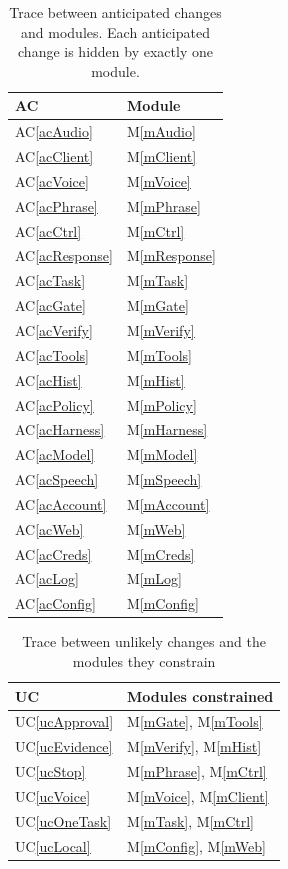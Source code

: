 \documentclass[12pt, titlepage]{article}
\newcommand{\acref}[1]{AC\ref{#1}}
\newcommand{\ucref}[1]{UC\ref{#1}}
\newcommand{\mref}[1]{M\ref{#1}}
\begin{document}
\begin{table}[H]
\centering
\begin{tabular}{|l|l|}
\hline
\textbf{AC} & \textbf{Module}\\
\hline
\acref{acAudio} & \mref{mAudio}\\
\hline
\acref{acClient} & \mref{mClient}\\
\hline
\acref{acVoice} & \mref{mVoice}\\
\hline
\acref{acPhrase} & \mref{mPhrase}\\
\hline
\acref{acCtrl} & \mref{mCtrl}\\
\hline
\acref{acResponse} & \mref{mResponse}\\
\hline
\acref{acTask} & \mref{mTask}\\
\hline
\acref{acGate} & \mref{mGate}\\
\hline
\acref{acVerify} & \mref{mVerify}\\
\hline
\acref{acTools} & \mref{mTools}\\
\hline
\acref{acHist} & \mref{mHist}\\
\hline
\acref{acPolicy} & \mref{mPolicy}\\
\hline
\acref{acHarness} & \mref{mHarness}\\
\hline
\acref{acModel} & \mref{mModel}\\
\hline
\acref{acSpeech} & \mref{mSpeech}\\
\hline
\acref{acAccount} & \mref{mAccount}\\
\hline
\acref{acWeb} & \mref{mWeb}\\
\hline
\acref{acCreds} & \mref{mCreds}\\
\hline
\acref{acLog} & \mref{mLog}\\
\hline
\acref{acConfig} & \mref{mConfig}\\
\hline
\end{tabular}
\caption{Trace between anticipated changes and modules. Each anticipated change
is hidden by exactly one module.}
\label{TblACT}
\end{table}

\begin{table}[H]
\centering
\begin{tabular}{|l|l|}
\hline
\textbf{UC} & \textbf{Modules constrained}\\
\hline
\ucref{ucApproval} & \mref{mGate}, \mref{mTools}\\
\hline
\ucref{ucEvidence} & \mref{mVerify}, \mref{mHist}\\
\hline
\ucref{ucStop} & \mref{mPhrase}, \mref{mCtrl}\\
\hline
\ucref{ucVoice} & \mref{mVoice}, \mref{mClient}\\
\hline
\ucref{ucOneTask} & \mref{mTask}, \mref{mCtrl}\\
\hline
\ucref{ucLocal} & \mref{mConfig}, \mref{mWeb}\\
\hline
\end{tabular}
\caption{Trace between unlikely changes and the modules they constrain}
\label{TblUCT}
\end{table}
\end{document}
